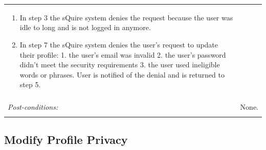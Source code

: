 \documentclass[11pt]{report}
\begin{document}
\begin{tabular}{ p{2cm} p{12cm} }
\begin{enumerate}
  \item In step 3 the sQuire system denies the request because the user was idle to long and is not logged in anymore. 
  \item In step 7 the sQuire system denies the user's request to update their profile: 1. the user's email was invalid 
  2. the user's password didn't meet the security requirements 3. the user used ineligible words or phrases. User is notified of the denial and is returned to step 5.
 \end{enumerate} \\
 \\
 \textit{Post-conditions:} & None. \\
 \\
\hline
\end{tabular}

\subsection{Modify Profile Privacy}
\end{document}
